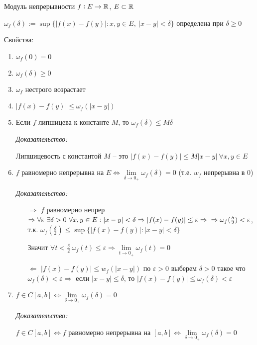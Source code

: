 \documentclass[12pt]{article}
\begin{document}
\begin{defin}{Модуль непрерывности}
    $f : E \to \mathbb R$, $E \subset \mathbb R$

    $\omega_f(\delta) := \sup\{ |f(x) - f(y)| : x, y \in E,\ |x - y| < \delta \}$ определена при $\delta \geq 0$

    \begin{theo}{Свойства:}
        \begin{enumerate}
            \item $\omega_f(0) = 0$
            \item $\omega_f(\delta) \geq 0$
            \item $\omega_f$ нестрого возрастает
            \item $|f(x) - f(y)| \leq \omega_f(|x - y|)$
            \item Если $f$ липшицева к константе $M$, то $\omega_f(\delta) \leq M\delta$
            
            \textit{Доказательство:}

            Липшицевость с константой $M$ -- это $|f(x) - f(y)| \leq M|x - y|\ \forall x, y \in E$

            \item $f$ равномерно непрерывна на $E \Leftrightarrow \lim\limits_{\delta \to 0_+} \omega_f(\delta) = 0$ (т.е. $w_f$ непрерывна в 0)
            
            \textit{Доказательство:}

            \begin{itemize}
                \item[$\Rightarrow$] $f$ равномерно непрер $\Rightarrow \forall \varepsilon\ \exists \delta > 0\ \forall x, y \in E : |x - y| < \delta \Rightarrow |f(x) - f(y)| \leq \varepsilon \Rightarrow \\
                \Rightarrow \omega_f(\frac{\delta}{2}) < \varepsilon$, т.к. $\omega_f(\frac{\delta}{2}) \leq \sup\{|f(x) - f(y)| : |x - y| < \delta\}$

                Значит $\forall t < \frac{\delta}{2}\ \omega_f(t) \leq \varepsilon \Rightarrow \lim\limits_{t \to 0_+} \omega_f(t) = 0$

                \item[$\Leftarrow$] $|f(x) - f(y)| \leq w_f(|x - y|)$ по $\varepsilon > 0$ выберем $\delta > 0$ такое что $\omega_f(\delta) < \varepsilon \Rightarrow$ если $|x - y| \leq \delta$, то $|f(x) - f(y)| \leq \omega_f(\delta) < \varepsilon$
            \end{itemize}

            \item $f \in C[a, b] \Leftrightarrow \lim\limits_{\delta \to 0_+} \omega_f(\delta) = 0$
            
            \textit{Доказательство:}

            $f \in C[a, b] \Leftrightarrow f$ равномерно непрерывна на $[a, b] \Leftrightarrow \lim\limits_{\delta \to 0_+} \omega_f(\delta) = 0$
        \end{enumerate}
    \end{theo}
\end{defin}
\end{document}
